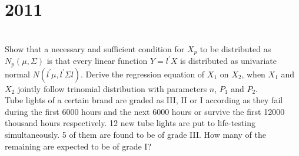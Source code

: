 \section*{2011}
\vspace{-.5cm}
\hrulefill \smallskip\\
 Show that a necessary and sufficient condition for $X_p$ to be distributed as $N_p(\mu,\Sigma)$ is that every linear function $Y=l^\prime X$ is distributed as univariate normal $N(l^\prime \mu,l^\prime \Sigma l)$.
\myline
{} Derive the regression equation of $X_1$ on $X_2$, when $X_1$ and $X_2$ jointly follow trinomial distribution with parameters $n$, $P_1$ and $P_2$. \smallskip \\
Tube lights of a certain brand are graded as III, II or I according as they fail during the first 6000 hours and the next 6000 hours or survive the first 12000 thousand hours respectively. 12 new tube lights are put to life-testing simultaneously. 5 of them are found to be of grade III. How many of the remaining are expected to be of grade I?